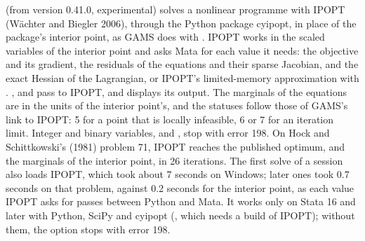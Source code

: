 \begin{optdesc}
\item[\optarg{sol}{ver}{ipopt}] (from version 0.41.0, experimental) solves a
nonlinear programme with IPOPT (W\"achter and Biegler 2006), through the
Python package cyipopt, in place of the package's interior point, as GAMS
does with . IPOPT works in the scaled variables of
the interior point and asks Mata for each value it needs: the objective and
its gradient, the residuals of the equations and their sparse Jacobian, and
the exact Hessian of the Lagrangian, or IPOPT's limited-memory approximation
with . ,
 and  pass to IPOPT, and 
displays its output. The marginals of the equations are in the units of the
interior point's, and the statuses follow those of GAMS's link to IPOPT: 5
for a point that is locally infeasible, 6 or 7 for an iteration limit.
Integer and binary variables, and , stop with error 198. On
Hock and Schittkowski's (1981) problem 71, IPOPT reaches the published
optimum, and the marginals of the interior point, in 26 iterations. The first
solve of a session also loads IPOPT, which took about 7 seconds on Windows;
later ones took 0.7 seconds on that problem, against 0.2 seconds for the
interior point, as each value IPOPT asks for passes between Python and Mata.
It works only on Stata 16 and later with Python, SciPy and cyipopt
(, which needs a build of IPOPT); without them, the
option stops with error 198.


\end{optdesc}
